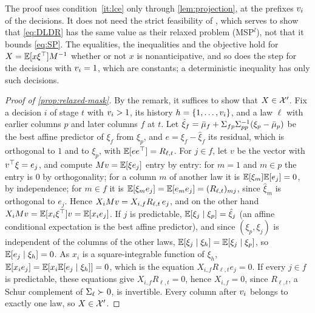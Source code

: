 \begin{remark}
The proof uses condition~\ref{it:lce} only through \cref{lem:projection}, at the prefixes $v_i$ of the decisions.
It does not need the strict feasibility of \citet[Proposition~4]{KWG2011}, which serves to show that \eqref{eq:DLDR} has the same value as their relaxed problem (MSP$^l$), not that it bounds \eqref{eq:SP}.
The equalities, the inequalities and the objective hold for $X = \mathbb{E}[x\xi^\top]M^{-1}$ whether or not $x$ is nonanticipative,
and so does the step for the decisions with $v_i = 1$, which are constants;
a deterministic inequality has only such decisions.
\end{remark}

\begin{proof}[Proof of \cref{prop:relaxed-mask}]
By the remark, it suffices to show that $X \in \mathcal{X}'$.
Fix a decision $i$ of stage $t$ with $v_i > 1$, its history $h = \{1, \dots, v_i\}$, and a law $\ell$ with earlier columns $p$ and later columns $f$ at $t$.
Let $\hat\xi_f = \bar\mu_f + \Sigma_{fp}\Sigma_{pp}^{-1}(\xi_p - \bar\mu_p)$ be the best affine predictor of $\xi_f$ from $\xi_p$, and $e = \xi_f - \hat\xi_f$ its residual,
which is orthogonal to $1$ and to $\xi_p$, with $\mathbb{E}[ee^\top] = R_{\ell,t}$.
For $j \in f$, let $v$ be the vector with $v^\top\xi = e_j$, and compute $M v = \mathbb{E}[\xi e_j]$ entry by entry:
for $m = 1$ and $m \in p$ the entry is $0$ by orthogonality;
for a column $m$ of another law it is $\mathbb{E}[\xi_m]\mathbb{E}[e_j] = 0$, by independence;
for $m \in f$ it is $\mathbb{E}[\xi_m e_j] = \mathbb{E}[e_m e_j] = (R_{\ell,t})_{mj}$, since $\hat\xi_m$ is orthogonal to $e_j$.
Hence $X_iM v = X_{i,f}R_{\ell,t}\,e_j$, and on the other hand $X_iM v = \mathbb{E}[x_i\xi^\top]v = \mathbb{E}[x_i e_j]$.
If $j$ is predictable, $\mathbb{E}[\xi_j\mid\xi_p] = \hat\xi_j$ (an affine conditional expectation is the best affine predictor),
and since $(\xi_p, \xi_j)$ is independent of the columns of the other laws, $\mathbb{E}[\xi_j\mid\xi_h] = \mathbb{E}[\xi_j\mid\xi_p]$, so $\mathbb{E}[e_j\mid\xi_h] = 0$.
As $x_i$ is a square-integrable function of $\xi_h$, $\mathbb{E}[x_ie_j] = \mathbb{E}[x_i\mathbb{E}[e_j\mid\xi_h]] = 0$, which is the equation $X_{i,f}R_{\ell,t}e_j = 0$.
If every $j \in f$ is predictable, these equations give $X_{i,f}R_{\ell,t} = 0$, hence $X_{i,f} = 0$, since $R_{\ell,t}$, a Schur complement of $\Sigma_\ell \succ 0$, is invertible.
Every column after $v_i$ belongs to exactly one law, so $X \in \mathcal{X}'$.
\end{proof}

